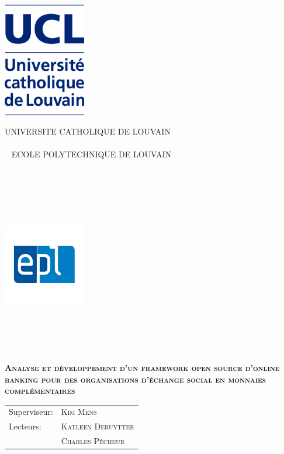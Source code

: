 \documentclass[british]{article}
\renewcommand\title{Analyse et développement d'un framework open source d'online banking pour des organisations d'échange social en monnaies complémentaires}
\newcommand\supervisor{ \textsc{Kim Mens}}
\newcommand\readerone{ \textsc{Katleen Deruytter}}
\newcommand\readertwo{ \textsc{Charles Pêcheur}}
\begin{document}
\thispagestyle{empty}
\noindent\begin{minipage}{.25\textwidth}
\noindent\includegraphics[width=3.6cm]{UCL.jpg}
\end{minipage}
\begin{minipage}{.5\textwidth}
\begin{center}
UNIVERSITE CATHOLIQUE DE LOUVAIN
\\~\\~
ECOLE POLYTECHNIQUE DE LOUVAIN
\\~\\~\\~\\~\\~
\end{center}
\end{minipage}
\begin{minipage}{.25\textwidth}
\hfill\includegraphics[width=3.6cm]{EPL.jpg}
\\~\\~\\~\\~
\end{minipage}
\vspace{4.5cm}
\begin{center}
\bfseries{\scshape{\Huge{\title}}}
\end{center}
\vspace{4.5cm}
\begin{minipage}{.5\textwidth}
\begin{tabular}{ll}
Superviseur: & \supervisor
\\ Lecteurs: & \readerone 
\\          & \readertwo 
\end{tabular} 
\\~\\~
\end{minipage}
\end{document}
